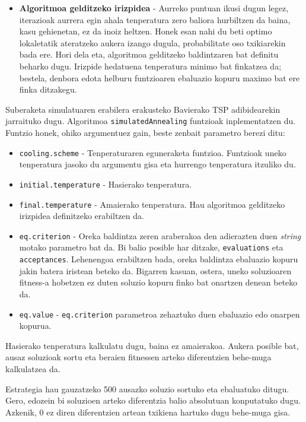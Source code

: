 \documentclass[eu]{ifirak}\usepackage[]{graphicx}\usepackage[]{color}
\newcommand{\code}[1]{\texttt{#1}}
\newcommand{\tq}{\textquotesingle}
\begin{document}
\begin{itemize}
\item \textbf{Algoritmoa gelditzeko irizpidea} - Aurreko puntuan ikusi dugun legez, iterazioak aurrera egin ahala tenperatura zero baliora hurbiltzen da baina, kasu gehienetan, ez da inoiz heltzen. Honek esan nahi du beti optimo lokaletatik ateratzeko aukera izango dugula, probabilitate oso txikiarekin bada ere. Hori dela eta, algoritmoa gelditzeko baldintzaren bat definitu beharko dugu. Irizpide hedatuena tenperatura minimo bat finkatzea da; bestela, denbora edota helburu funtzioaren ebaluazio kopuru maximo bat ere finka ditzakegu.
\end{itemize}

Suberaketa simulatuaren erabilera erakusteko Bavierako TSP adibidearekin jarraituko dugu. Algoritmoa \code{simulatedAnnealing} funtzioak inplementatzen du. Funtzio honek, ohiko argumentuez gain, beste zenbait parametro berezi ditu:

\begin{itemize}
\item \code{cooling.scheme} - Tenperaturaren eguneraketa funtzioa. Funtzioak uneko tenperatura jasoko du argumentu gisa eta hurrengo tenperatura itzuliko du.
\item \code{initial.temperature} - Hasierako tenperatura.
\item \code{final.temperature} - Amaierako tenperatura. Hau algoritmoa gelditzeko irizpidea definitzeko erabiltzen da.
\item \code{eq.criterion} - Oreka baldintza zeren araberakoa den adierazten duen \textit{string} motako parametro bat da. Bi balio posible har ditzake, \code{\tq evaluations\tq} eta \code{\tq acceptances\tq}. Lehenengoa erabiltzen bada, oreka baldintza ebaluazio kopuru jakin batera iristean beteko da. Bigarren kasuan, ostera, uneko soluzioaren fitness-a hobetzen ez duten soluzio kopuru finko bat onartzen denean beteko da.
\item \code{eq.value} - \code{eq.criterion} parametroa zehaztuko duen ebaluazio edo onarpen kopurua.
\end{itemize}

 Hasierako tenperatura kalkulatu dugu, baina ez amaierakoa. Aukera posible bat, ausaz soluzioak sortu eta beraien fitnessen arteko diferentzien behe-muga kalkulatzea da.

Estrategia hau gauzatzeko 500 ausazko soluzio sortuko eta ebaluatuko ditugu. Gero, edozein bi soluzioen arteko diferentzia balio absolutuan konputatuko dugu. Azkenik, 0 ez diren diferentzien artean txikiena hartuko dugu behe-muga gisa.
\end{document}
